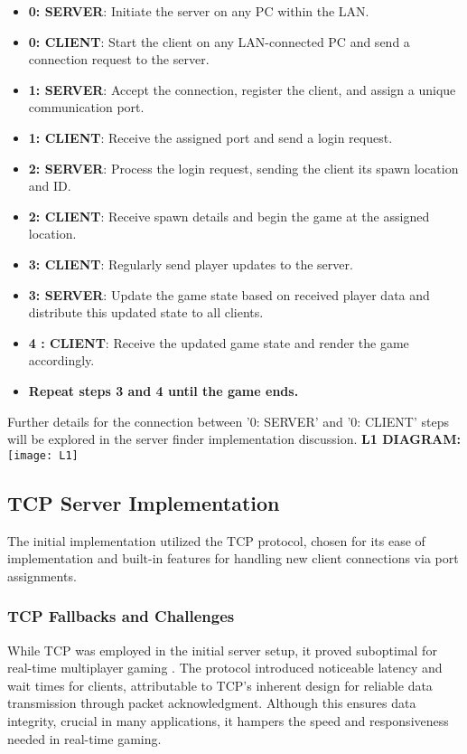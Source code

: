\begin{itemize}
    \item \textbf{0: SERVER}: Initiate the server on any PC within the LAN.
    \item \textbf{0: CLIENT}: Start the client on any LAN-connected PC and send a connection request to the server.
    \item \textbf{1: SERVER}: Accept the connection, register the client, and assign a unique communication port.
    \item \textbf{1: CLIENT}: Receive the assigned port and send a login request.
    \item \textbf{2: SERVER}: Process the login request, sending the client its spawn location and ID.
    \item \textbf{2: CLIENT}: Receive spawn details and begin the game at the assigned location.
    \item \textbf{3: CLIENT}: Regularly send player updates to the server.
    \item \textbf{3: SERVER}: Update the game state based on received player data and distribute this updated state to all clients.
    \item \textbf{4 : CLIENT}: Receive the updated game state and render the game accordingly.
    \item \textbf{Repeat steps 3 and 4 until the game ends.} 
\end{itemize}

Further details for the connection between '0: SERVER' and '0: CLIENT' steps will be explored in the server finder implementation discussion.
\newline 
\hfill \break
\newline 
\hfill \break
\textbf{L1 DIAGRAM:}
\newline 
\hfill \break
\texttt{[image: L1]}

\subsection{TCP Server Implementation}
The initial implementation utilized the TCP protocol, chosen for its ease of implementation and built-in features for handling new client connections via port assignments.

\subsubsection{TCP Fallbacks and Challenges}
While TCP was employed in the initial server setup, it proved suboptimal for real-time multiplayer gaming \cite{tcpnotneeded}. The protocol introduced noticeable latency and wait times for clients, attributable to TCP's inherent design for reliable data transmission through packet acknowledgment. Although this ensures data integrity, crucial in many applications, it hampers the speed and responsiveness needed in real-time gaming.

